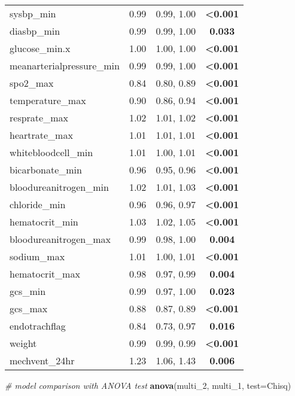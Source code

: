 \documentclass[
]{article}
\newenvironment{Shaded}{\begin{snugshade}}{\end{snugshade}}
\newcommand{\AttributeTok}[1]{\textcolor[rgb]{0.13,0.29,0.53}{#1}}
\newcommand{\CommentTok}[1]{\textcolor[rgb]{0.56,0.35,0.01}{\textit{#1}}}
\newcommand{\FunctionTok}[1]{\textcolor[rgb]{0.13,0.29,0.53}{\textbf{#1}}}
\newcommand{\NormalTok}[1]{#1}
\newcommand{\StringTok}[1]{\textcolor[rgb]{0.31,0.60,0.02}{#1}}
\begin{document}
\begin{longtable}[]{@{}lccc@{}}
sysbp\_min & 0.99 & 0.99, 1.00 & \textbf{\textless0.001} \\
diasbp\_min & 0.99 & 0.99, 1.00 & \textbf{0.033} \\
glucose\_min.x & 1.00 & 1.00, 1.00 & \textbf{\textless0.001} \\
meanarterialpressure\_min & 0.99 & 0.99, 1.00 &
\textbf{\textless0.001} \\
spo2\_max & 0.84 & 0.80, 0.89 & \textbf{\textless0.001} \\
temperature\_max & 0.90 & 0.86, 0.94 & \textbf{\textless0.001} \\
resprate\_max & 1.02 & 1.01, 1.02 & \textbf{\textless0.001} \\
heartrate\_max & 1.01 & 1.01, 1.01 & \textbf{\textless0.001} \\
whitebloodcell\_min & 1.01 & 1.00, 1.01 & \textbf{\textless0.001} \\
bicarbonate\_min & 0.96 & 0.95, 0.96 & \textbf{\textless0.001} \\
bloodureanitrogen\_min & 1.02 & 1.01, 1.03 & \textbf{\textless0.001} \\
chloride\_min & 0.96 & 0.96, 0.97 & \textbf{\textless0.001} \\
hematocrit\_min & 1.03 & 1.02, 1.05 & \textbf{\textless0.001} \\
bloodureanitrogen\_max & 0.99 & 0.98, 1.00 & \textbf{0.004} \\
sodium\_max & 1.01 & 1.00, 1.01 & \textbf{\textless0.001} \\
hematocrit\_max & 0.98 & 0.97, 0.99 & \textbf{0.004} \\
gcs\_min & 0.99 & 0.97, 1.00 & \textbf{0.023} \\
gcs\_max & 0.88 & 0.87, 0.89 & \textbf{\textless0.001} \\
endotrachflag & 0.84 & 0.73, 0.97 & \textbf{0.016} \\
weight & 0.99 & 0.99, 0.99 & \textbf{\textless0.001} \\
mechvent\_24hr & 1.23 & 1.06, 1.43 & \textbf{0.006} \\
\end{longtable}

\begin{Shaded}
\begin{Highlighting}[]
\CommentTok{\# model comparison with ANOVA test}
\FunctionTok{anova}\NormalTok{(multi\_2, multi\_1, }\AttributeTok{test=}\StringTok{\textquotesingle{}Chisq\textquotesingle{}}\NormalTok{)}
\end{Highlighting}
\end{Shaded}
\end{document}
